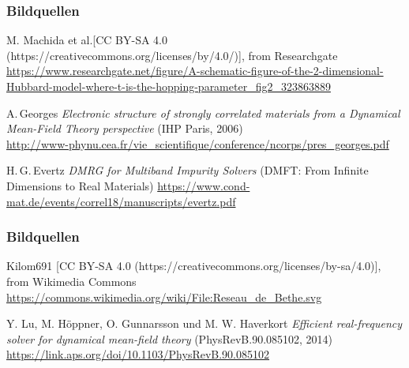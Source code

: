 \documentclass{beamer}
\begin{document}
\appendix

\begin{thebibliography}{}
\begin{frame}
\frametitle{Bildquellen}	
	M. Machida et al.[CC BY-SA 4.0 (https://creativecommons.org/licenses/by/4.0/)], from Researchgate
	\url{https://www.researchgate.net/figure/A-schematic-figure-of-the-2-dimensional-Hubbard-model-where-t-is-the-hopping-parameter_fig2_323863889}
	
	A.\,Georges {\it Electronic structure of strongly correlated materials from a Dynamical Mean-Field Theory perspective} (IHP Paris, 2006)\\
	\url{http://www-phynu.cea.fr/vie_scientifique/conference/ncorps/pres_georges.pdf} 
	
	H.\,G.\,Evertz {\it DMRG for Multiband Impurity Solvers} (DMFT: From Infinite Dimensions to Real Materials)
	\url{https://www.cond-mat.de/events/correl18/manuscripts/evertz.pdf}	
\end{frame}	
\begin{frame}
\frametitle{Bildquellen}
Kilom691 [CC BY-SA 4.0 (https://creativecommons.org/licenses/by-sa/4.0)], from Wikimedia Commons
\url{https://commons.wikimedia.org/wiki/File:Reseau_de_Bethe.svg}

	Y. Lu, M. Höppner, O. Gunnarsson und M. W. Haverkort {\it Efficient real-frequency solver for dynamical mean-field theory} (PhysRevB.90.085102, 2014)\\
	\url{https://link.aps.org/doi/10.1103/PhysRevB.90.085102}

\end{frame}
\end{thebibliography}
\end{document}

